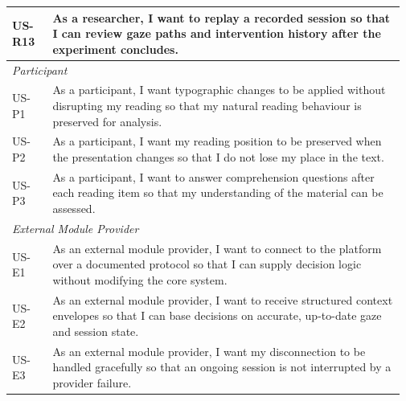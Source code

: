 \begin{longtable}{@{} p{0.10\linewidth} p{0.87\linewidth} @{}}
US-R13 & As a researcher, I want to replay a recorded session so that I can review gaze paths and intervention history after the experiment concludes. \\
\midrule
\multicolumn{2}{l}{\textit{Participant}} \\
\midrule
US-P1  & As a participant, I want typographic changes to be applied without disrupting my reading so that my natural reading behaviour is preserved for analysis. \\[2pt]
US-P2  & As a participant, I want my reading position to be preserved when the presentation changes so that I do not lose my place in the text. \\[2pt]
US-P3  & As a participant, I want to answer comprehension questions after each reading item so that my understanding of the material can be assessed. \\
\midrule
\multicolumn{2}{l}{\textit{External Module Provider}} \\
\midrule
US-E1  & As an external module provider, I want to connect to the platform over a documented protocol so that I can supply decision logic without modifying the core system. \\[2pt]
US-E2  & As an external module provider, I want to receive structured context envelopes so that I can base decisions on accurate, up-to-date gaze and session state. \\[2pt]
US-E3  & As an external module provider, I want my disconnection to be handled gracefully so that an ongoing session is not interrupted by a provider failure. \\

\end{longtable}
\endgroup
